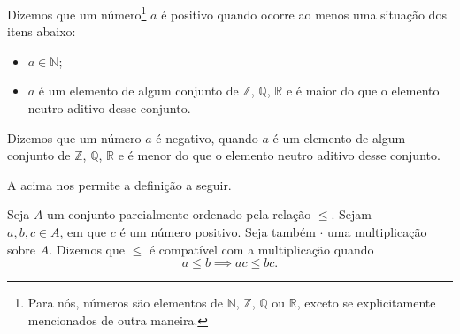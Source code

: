 \documentclass[../main.tex]{subfiles}
\begin{document}
\begin{defi}\label{agb-def-numPositivo}
    Dizemos que um número\footnote{Para nós, números são elementos de $\mathbb{N}$, $\mathbb{Z}$, $\mathbb{Q}$ ou $\mathbb{R}$, exceto se explicitamente mencionados de outra maneira.} $a$ é positivo quando ocorre ao menos uma situação dos itens abaixo:
    \begin{itemize}
        \item $a \in \mathbb{N}$;
        \item $a$ é um elemento de algum conjunto de $\mathbb{Z}$, $\mathbb{Q}$, $\mathbb{R}$ e é maior do que o elemento neutro aditivo desse conjunto.
    \end{itemize}
\end{defi}
\begin{defi}\label{agb-def-numNegativo}
    Dizemos que um número $a$ é negativo, quando $a$ é um elemento de algum conjunto de $\mathbb{Z}$, $\mathbb{Q}$, $\mathbb{R}$ e é menor do que o elemento neutro aditivo desse conjunto.
\end{defi}
A  acima nos permite a definição a seguir.
\begin{defi}\label{agb-def-ordemCompativelProduto}
    Seja $A$ um conjunto parcialmente ordenado pela relação $\leq$. Sejam \\ $a,b,c \in A$, em que $c$ é um número positivo. Seja também $\cdot$ uma multiplicação sobre $A$.
    Dizemos que $\leq$ é compatível com a multiplicação quando 
    \[ a \leq b \implies ac \leq bc. \]
\end{defi}



\end{document}
